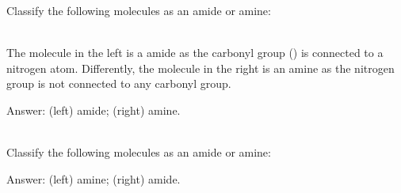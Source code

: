 \documentclass[main.tex]{subfiles}
\newcommand{\mytriangleright}[1]{\tikz{\filldraw[draw=#1,fill=#1] (0,0) --(0em,0.6em) -- (0.4em,0.3em);}}
\begin{document}
\begin{description}
\begin{example} %
Classify the following molecules as an amide or amine:
\begin{center} \hspace{0.5cm}  \end{center}
\\
The molecule in the left is a amide as the carbonyl group () is connected to a nitrogen atom. Differently, the molecule in the right is an amine as the nitrogen group is not connected to any carbonyl group.
\begin{flushright}  \mytriangleright{dgreen}\small Answer: (left) amide; (right) amine. \end{flushright}
\faDiamond\ \\
Classify the following molecules as an amide or amine:
\begin{center}  \hspace{0.5cm}        \end{center}

\begin{flushright}  \mytriangleright{dgreen}\small Answer: (left) amine; (right) amide. \end{flushright}
\end{example}%






\end{description}
\end{document}

